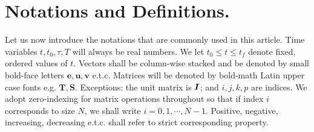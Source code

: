 \section{Notations and Definitions.}
\label{sec:notations}

Let us now introduce the notations that are commonly used in this article. 
Time variables \eg $t, t_0, \tau, T$ will always be  real numbers. We let $t_0 \le t \le t_f$ denote fixed, ordered values of $t$. Vectors shall be column-wise stacked and be denoted by small bold-face letters \ie $\mathbf{e}, \mathbf{u}, \mathbf{v}$  e.t.c. %
Matrices  will  be denoted by bold-math Latin  upper case  fonts  e.g. $\mathbf{T}, \mathbf{S}$.  %
Exceptions: the unit matrix is $\bm{I}$; and $i,j,k,p$ are indices.  We adopt zero-indexing for matrix operations throughout so that if index $i$ corresponds to size $N$, we shall write $i = 0, 1, \cdots , N-1$. %
Positive, negative, increasing, decreasing  e.t.c. shall refer to strict corresponding property.
%
%
%
%
%
